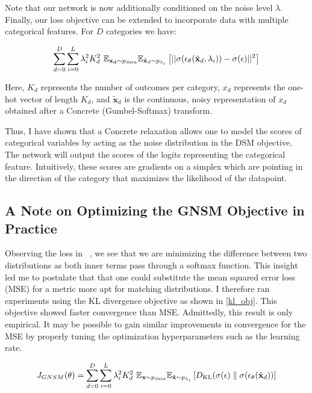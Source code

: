 Note that our network is now additionally conditioned on the noise level $\lambda$. Finally, our loss objective can be extended to incorporate data with multiple categorical features. For $D$ categories we have:

\begin{equation}
\label{eq:ncsn_obj}
    \sum_{d=0}^{D} \sum_{i=0}^{L} \lambda_i^2 K_d^2 ~\mathbb{E}_{\mathbf{x_d} \sim p_{\text{data}}} \mathbb{E}_{\Tilde{\mathbf{x}}_d \sim p_{\lambda_i}} \left[ { || \sigma( \epsilon_\theta(\tilde{\mathbf{x}}_d,  \lambda_i) ) - \sigma(\epsilon)||^2 } \right]
\end{equation}

Here, $K_d$ represents the number of outcomes per category, $x_d$ represents the one-hot vector of length $K_d$, and  $\tilde{\mathbf{x}}_d$ is the continuous, noisy representation of $x_d$ obtained after a Concrete (Gumbel-Softmax) transform.

Thus, I have shown that a Concrete relaxation allows one to model the scores of categorical variables by acting as the noise distribution in the DSM objective. The network will output the scores of the logits representing the categorical feature. Intuitively, these scores are gradients on a simplex which are pointing in the direction of the category that maximizes the likelihood of the datapoint.

\subsection*{A Note on Optimizing the GNSM Objective in Practice}

Observing the loss in ~, we see that we are minimizing the difference between two distributions as both inner terms pass through a softmax function. This insight led me to postulate that that one could substitute the mean squared error loss (MSE) for a metric more apt for matching distributions. I therefore ran experiments using the KL divergence objective as shown in \eqref{kl_obj}. This objective showed faster convergence than MSE. Admittedly, this result is only empirical. It may be possible to gain similar improvements in convergence for the MSE by properly tuning the optimization hyperparameters such as the learning rate.

\begin{equation}
\label{kl_obj}
    J_{GNSM}(\theta)  =  \sum_{d=0}^{D} \sum_{i=0}^{L} \lambda_i^2 K_d^2 ~\mathbb{E}_{\mathbf{x} \sim p_{\text{data}}} \mathbb{E}_{\Tilde{\mathbf{x}} \sim p_{\lambda_i}} \left[ { D_{\text{KL}} (\sigma(\epsilon) \parallel  \sigma( \epsilon_\theta(\tilde{\mathbf{x}}_d) ) } \right]
\end{equation}


